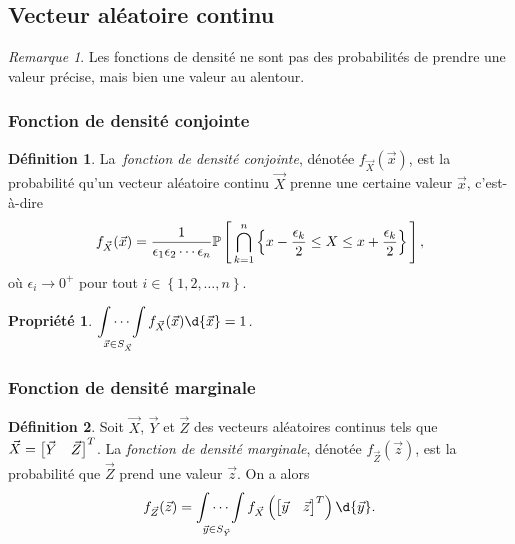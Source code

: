 \documentclass[11pt]{article}
\makeatletter
\renewcommand\P[1]{%
	\ensuremath{%
		\mathbb{P}\left[\,#1\,\right]%
	}%
}%
\newcommand\invec[1]{%
	\ensuremath{%
		\left[%
			\begin{matrix}%
				#1%
			\end{matrix}%
		\right]^T%
	}%
}%
\newtheorem{property}{Propriété}
\theoremstyle{remark}
\newtheorem*{remark}{Remarque}
\theoremstyle{definition}
\newtheorem*{@definition}{Définition}
\newenvironment{definition}{%
	\begin{@definition}%
}{%
	\end{@definition}%
	\setcounter{property}{0}%
}
\makeatother
\begin{document}
\subsection{Vecteur aléatoire continu}
\begin{remark}
	Les fonctions de densité ne sont pas des probabilités de prendre une
	valeur précise, mais bien une valeur au alentour.
\end{remark}

\subsubsection{Fonction de densité conjointe}
\begin{definition}
	La \textit{fonction de densité conjointe}, dénotée $f_{\vec{X}}(\vec{x})$,
	est la probabilité qu'un vecteur aléatoire continu $\vec{X}$ prenne une
	certaine valeur $\vec{x}$, c'est-à-dire
	\begin{equation*}
		f_{\vec{X}}(\vec{x})
		=\frac{1}{\epsilon_1\epsilon_2\cdots\epsilon_n}\P{
			\bigcap_{k=1}^n\left\{
				x-\frac{\epsilon_k}{2}\leq X\leq x+\frac{\epsilon_k}{2}
			\right\}},
	\end{equation*}
	où $\epsilon_i\rightarrow 0^+$ pour tout $i\in\left\{1,2,\dots,n\right\}$.
\end{definition}

\begin{property}
	$\displaystyle\idotsint\limits_{\vec{x}\in S_{\vec{X}}}f_{\vec{X}}(\vec{x})
	\d{\vec{x}}=1$.
\end{property}

\subsubsection{Fonction de densité marginale}
\begin{definition}
	Soit $\vec{X}$, $\vec{Y}$ et $\vec{Z}$ des vecteurs aléatoires continus
	tels que $\vec{X}=\invec{\vec{Y}&\vec{Z}}$. La \textit{fonction de densité
	marginale}, dénotée $f_{\vec{Z}}(\vec{z})$, est la probabilité que
	$\vec{Z}$ prend une valeur $\vec{z}$. On a alors
	\begin{equation*}
		f_{\vec{Z}}(\vec{z})=\idotsint\limits_{\vec{y}\in S_{\vec{Y}}}
		f_{\vec{X}}\left(\invec{\vec{y}&\vec{z}}\right)\d{\vec{y}}.
	\end{equation*}
\end{definition}
\end{document}
